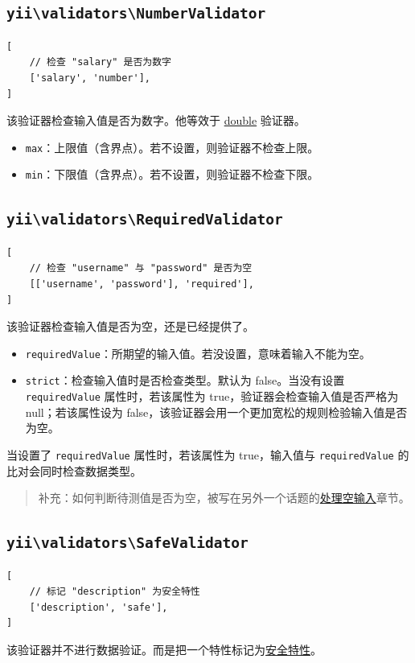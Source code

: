 \subsection{\texttt{yii{\allowbreak{}\textbackslash}validators{\allowbreak{}\textbackslash}NumberValidator} \label{tutorial-core-validators.md::number}}
\lstset{language=php}\begin{lstlisting}
[
    // 检查 "salary" 是否为数字
    ['salary', 'number'],
]
\end{lstlisting}
该验证器检查输入值是否为数字。他等效于 \hyperref[tutorial-core-validators.md::::double]{double} 验证器。

\begin{itemize}
\item \lstinline|max|：上限值（含界点）。若不设置，则验证器不检查上限。
\item \lstinline|min|：下限值（含界点）。若不设置，则验证器不检查下限。
\end{itemize}
\subsection{\texttt{yii{\allowbreak{}\textbackslash}validators{\allowbreak{}\textbackslash}RequiredValidator} \label{tutorial-core-validators.md::required}}
\lstset{language=php}\begin{lstlisting}
[
    // 检查 "username" 与 "password" 是否为空
    [['username', 'password'], 'required'],
]
\end{lstlisting}
该验证器检查输入值是否为空，还是已经提供了。

\begin{itemize}
\item \lstinline|requiredValue|：所期望的输入值。若没设置，意味着输入不能为空。
\item \lstinline|strict|：检查输入值时是否检查类型。默认为 false。当没有设置 \lstinline|requiredValue| 属性时，若该属性为 true，验证器会检查输入值是否严格为 null；若该属性设为 false，该验证器会用一个更加宽松的规则检验输入值是否为空。
\end{itemize}
当设置了 \lstinline|requiredValue| 属性时，若该属性为 true，输入值与 \lstinline|requiredValue| 的比对会同时检查数据类型。

\begin{quote}补充：如何判断待测值是否为空，被写在另外一个话题的\hyperref[input-validation.md::handling-empty-inputs]{处理空输入}章节。

\end{quote}
\subsection{\texttt{yii{\allowbreak{}\textbackslash}validators{\allowbreak{}\textbackslash}SafeValidator} \label{tutorial-core-validators.md::safe}}
\lstset{language=php}\begin{lstlisting}
[
    // 标记 "description" 为安全特性
    ['description', 'safe'],
]
\end{lstlisting}
该验证器并不进行数据验证。而是把一个特性标记为\hyperref[structure-models.md::safe-attributes]{安全特性}。


